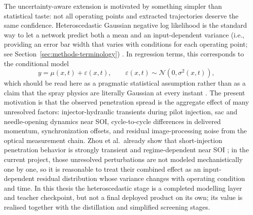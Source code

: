 \documentclass[english, 12pt, a4paper, elec, utf8, a-2b, online]{aaltothesis}
\begin{document}
The uncertainty-aware extension is motivated by something simpler than statistical taste: 
not all operating points and extracted trajectories deserve the same confidence. 
Heteroscedastic Gaussian negative log likelihood is the standard way to let a network predict both a mean and an input-dependent variance (i.e., providing an error bar width that varies with conditions for each operating point; see Section~\ref{sec:methods-terminology}) 
\cite{KendallGal2017}. 
In regression terms, this corresponds to the conditional model
\[
y=\mu(x,t)+\varepsilon(x,t),\qquad \varepsilon(x,t)\sim \mathcal{N}(0,\sigma^2(x,t)),
\]
which should be read here as a pragmatic statistical assumption rather than as a claim that the spray physics are literally Gaussian at every instant 
\cite{BishopPRML2006,KendallGal2017}. 
The present motivation is that the observed penetration spread is the aggregate effect of many unresolved factors: 
injector-hydraulic transients during pilot injection, sac and needle-opening dynamics near SOI, cycle-to-cycle differences in delivered momentum, 
synchronization offsets, and residual image-processing noise from the optical measurement chain. 
Zhou et al.\ already show that short-injection penetration behavior is strongly transient and regime-dependent near SOI \cite{ZhouLiYi2021}; 
in the current project, those unresolved perturbations are not modeled mechanistically one by one, 
so it is reasonable to treat their combined effect as an input-dependent residual distribution whose variance changes with operating condition and time. 
In this thesis the heteroscedastic stage is a completed modelling layer and teacher checkpoint, 
but not a final deployed product on its own; 
its value is realised together with the distillation and simplified screening stages.
\end{document}
